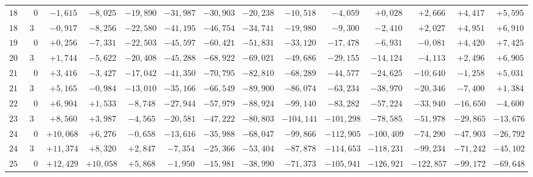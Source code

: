 \begin{landscape}
\begin{longtable}{@{}rr|r|r|r|r|r|r|r|r|r|r|r|r@{}}
\(180\) & \(0\) & \(-1{,}615\) & \(-8{,}025\) & \(-19{,}890\) & \(-31{,}987\) & \(-30{,}903\) & \(-20{,}238\) & \(-10{,}518\) & \(-4{,}059\) & \(+0{,}028\) & \(+2{,}666\) & \(+4{,}417\) & \(+5{,}595\)\\
\(187\) & \(30\) & \(-0{,}917\) & \(-8{,}256\) & \(-22{,}580\) & \(-41{,}195\) & \(-46{,}754\) & \(-34{,}741\) & \(-19{,}980\) & \(-9{,}300\) & \(-2{,}410\) & \(+2{,}027\) & \(+4{,}951\) & \(+6{,}910\)\\
\(195\) & \(0\) & \(+0{,}256\) & \(-7{,}331\) & \(-22{,}503\) & \(-45{,}597\) & \(-60{,}421\) & \(-51{,}831\) & \(-33{,}120\) & \(-17{,}478\) & \(-6{,}931\) & \(-0{,}081\) & \(+4{,}420\) & \(+7{,}425\)\\
\(202\) & \(30\) & \(+1{,}744\) & \(-5{,}622\) & \(-20{,}408\) & \(-45{,}288\) & \(-68{,}922\) & \(-69{,}021\) & \(-49{,}686\) & \(-29{,}155\) & \(-14{,}124\) & \(-4{,}113\) & \(+2{,}496\) & \(+6{,}905\)\\[2pt]
\(210\) & \(0\) & \(+3{,}416\) & \(-3{,}427\) & \(-17{,}042\) & \(-41{,}350\) & \(-70{,}795\) & \(-82{,}810\) & \(-68{,}289\) & \(-44{,}577\) & \(-24{,}625\) & \(-10{,}640\) & \(-1{,}258\) & \(+5{,}031\)\\
\(217\) & \(30\) & \(+5{,}165\) & \(-0{,}984\) & \(-13{,}010\) & \(-35{,}166\) & \(-66{,}549\) & \(-89{,}900\) & \(-86{,}074\) & \(-63{,}234\) & \(-38{,}970\) & \(-20{,}346\) & \(-7{,}400\) & \(+1{,}384\)\\
\(225\) & \(0\) & \(+6{,}904\) & \(+1{,}533\) & \(-8{,}748\) & \(-27{,}944\) & \(-57{,}979\) & \(-88{,}924\) & \(-99{,}140\) & \(-83{,}282\) & \(-57{,}224\) & \(-33{,}940\) & \(-16{,}650\) & \(-4{,}600\)\\
\(232\) & \(30\) & \(+8{,}560\) & \(+3{,}987\) & \(-4{,}565\) & \(-20{,}581\) & \(-47{,}222\) & \(-80{,}803\) & \(-104{,}141\) & \(-101{,}298\) & \(-78{,}585\) & \(-51{,}978\) & \(-29{,}865\) & \(-13{,}676\)\\[2pt]
\(240\) & \(0\) & \(+10{,}068\) & \(+6{,}276\) & \(-0{,}658\) & \(-13{,}616\) & \(-35{,}988\) & \(-68{,}047\) & \(-99{,}866\) & \(-112{,}905\) & \(-100{,}409\) & \(-74{,}290\) & \(-47{,}903\) & \(-26{,}792\)\\
\(247\) & \(30\) & \(+11{,}374\) & \(+8{,}320\) & \(+2{,}847\) & \(-7{,}354\) & \(-25{,}366\) & \(-53{,}404\) & \(-87{,}878\) & \(-114{,}653\) & \(-118{,}231\) & \(-99{,}234\) & \(-71{,}242\) & \(-45{,}102\)\\
\(255\) & \(0\) & \(+12{,}429\) & \(+10{,}058\) & \(+5{,}868\) & \(-1{,}950\) & \(-15{,}981\) & \(-38{,}990\) & \(-71{,}373\) & \(-105{,}941\) & \(-126{,}921\) & \(-122{,}857\) & \(-99{,}172\) & \(-69{,}648\)\\

\end{longtable}
\end{landscape}
